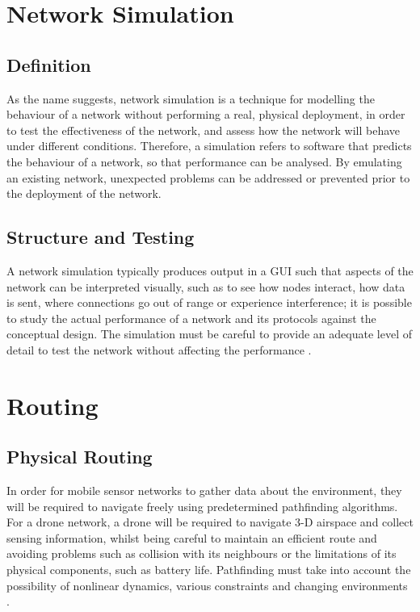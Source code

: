 \documentclass[12pt,a4paper,twoside]{report}
\begin{document}
	\section{Network Simulation}
		\subsection{Definition}
		As the name suggests, network simulation is a technique for modelling the behaviour of a network without performing a real, physical deployment, in order to test the effectiveness of the network, and assess how the network will behave under different conditions. Therefore, a simulation refers to software that predicts the behaviour of a network, so that performance can be analysed. By emulating an existing network, unexpected problems can be addressed or prevented prior to the deployment of the network.
		\subsection{Structure and Testing}
		A network simulation typically produces output in a GUI such that aspects of the network can be interpreted visually, such as to see how nodes interact, how data is sent, where connections go out of range or experience interference; it is possible to study the actual performance of a network and its protocols against the conceptual design. The simulation must be careful to provide an adequate level of detail to test the network without affecting the performance \citep{ leebreslauetal2000}. 
	\section{Routing}
		\subsection{Physical Routing}
		In order for mobile sensor networks to gather data about the environment, they will be required to navigate freely using predetermined pathfinding algorithms. For a drone network, a drone will be required to navigate 3-D airspace and collect sensing information, whilst being careful to maintain an efficient route and avoiding problems such as collision with its neighbours or the limitations of its physical components, such as battery life. Pathfinding must take into account the possibility of nonlinear dynamics, various constraints and changing environments \citep{robertsivillietal2012}.
\end{document}
